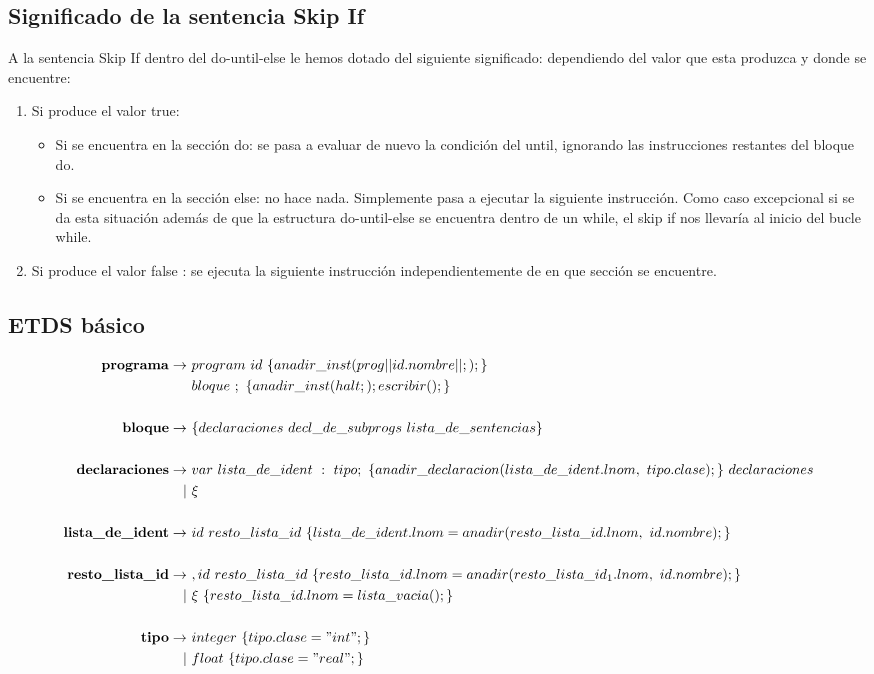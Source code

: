\documentclass[12pt,a4paper,landscape]{article}
\theoremstyle{mytheor}
\begin{document}
\subsection{Significado de la sentencia Skip If}
A la sentencia Skip If dentro del do-until-else le hemos dotado del siguiente significado: dependiendo del valor que esta produzca y donde se encuentre:
\begin{enumerate}
\item Si produce el valor true:
    \begin{itemize}
    \item Si se encuentra en la sección do: se pasa a evaluar de nuevo la condición del until, ignorando las instrucciones restantes del bloque do.
    \item Si se encuentra en la sección else: no hace nada. Simplemente pasa a ejecutar la siguiente instrucción. Como caso excepcional si se da esta situación además de que la estructura do-until-else se encuentra dentro de un while, el skip if nos llevaría al inicio del bucle while.
    \end{itemize}
\item Si produce el valor false : se ejecuta la siguiente instrucción independientemente de en que sección se encuentre.
\end{enumerate}


\subsection{ETDS básico}
\begin{center}
  \begin{align*}
    \text{\textbf{programa}} \to\ & program\ id\ \{ anadir\_inst( prog|| id.nombre || ;); \}\\
    & bloque\  ;\  \{ anadir\_inst(halt; ); escribir();\}\\\\
    \text{\textbf{ bloque}} \to\ &\{ declaraciones\ decl\_de\_subprogs\ lista\_de\_sentencias \}\\\\
    \text{\textbf{declaraciones}} \to\ & var\ lista\_de\_ident\ :\ tipo;\ \{ anadir\_declaracion(lista\_de\_ident.lnom,\ tipo.clase);\}\ declaraciones\\
    |\ &\xi\\\\
    \text{\textbf{lista\_de\_ident}} \to\ & id\ resto\_lista\_id\ \{lista\_de\_ident.lnom=anadir(resto\_lista\_id.lnom,\ id.nombre);\}\\\\
    \text{\textbf{ resto\_lista\_id}} \to\ & ,id\ resto\_lista\_id\  \{resto\_lista\_id.lnom=anadir(resto\_lista\_id_1.lnom,\ id.nombre);\} \\
    |\ &\xi\ \{resto\_lista\_id.lnom=lista\_vacia();\}\\\\
     \text{\textbf{tipo}} \to\ & integer\ \{tipo.clase="int"; \}\\
    |\ & float\ \{tipo.clase="real"; \}\\\\
  \end{align*}
\end{center}
\end{document}
